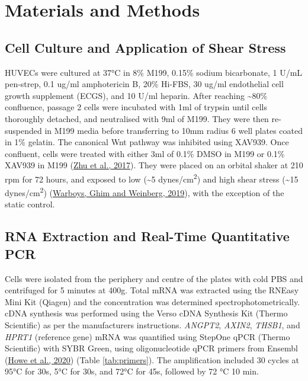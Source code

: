 \documentclass[
  11pt,
]{article}
\begin{document}
\hypertarget{materials-and-methods}{%
\section{Materials and Methods}\label{materials-and-methods}}

\hypertarget{cell-culture-and-application-of-shear-stress}{%
\subsection{Cell Culture and Application of Shear Stress}\label{cell-culture-and-application-of-shear-stress}}

HUVECs were cultured at 37°C in 8\% M199, 0.15\% sodium bicarbonate, 1 U/mL pen-strep, 0.1 ug/ml amphotericin B, 20\% Hi-FBS, 30 ug/ml endothelial cell growth supplement (ECGS), and 10 U/ml heparin.
After reaching \textasciitilde80\% confluence, passage 2 cells were incubated with 1ml of trypsin until cells thoroughly detached, and neutralised with 9ml of M199.
They were then re-suspended in M199 media before transferring to 10mm radius 6 well plates coated in 1\% gelatin.
The canonical Wnt pathway was inhibited using XAV939.
Once confluent, cells were treated with either 3ml of 0.1\% DMSO in M199 or 0.1\% XAV939 in M199 (\protect\hyperlink{ref-Zhu2017}{Zhu et al., 2017}).
They were placed on an orbital shaker at 210 rpm for 72 hours, and exposed to low (\textasciitilde5 dynes/cm\textsuperscript{2}) and high shear stress (\textasciitilde15 dynes/cm\textsuperscript{2}) (\protect\hyperlink{ref-Warboys2019}{Warboys, Ghim and Weinberg, 2019}), with the exception of the static control.

\hypertarget{rna-extraction-and-real-time-quantitative-pcr}{%
\subsection{RNA Extraction and Real-Time Quantitative PCR}\label{rna-extraction-and-real-time-quantitative-pcr}}

Cells were isolated from the periphery and centre of the plates with cold PBS and centrifuged for 5 minutes at 400g.
Total mRNA was extracted using the RNEasy Mini Kit (Qiagen) and the concentration was determined spectrophotometrically.
cDNA synthesis was performed using the Verso cDNA Synthesis Kit (Thermo Scientific) as per the manufacturers instructions.
\emph{ANGPT2}, \emph{AXIN2}, \emph{THSB1}, and \emph{HPRT1} (reference gene) mRNA was quantified using StepOne qPCR (Thermo Scientific) with SYBR Green, using oligonucleotide qPCR primers from Ensembl (\protect\hyperlink{ref-howe2020}{Howe et al., 2020}) (Table \ref{tab:primers}).
The amplification included 30 cycles at 95°C for 30s, 5°C for 30s, and 72°C for 45s, followed by 72 °C 10 min.
\end{document}
